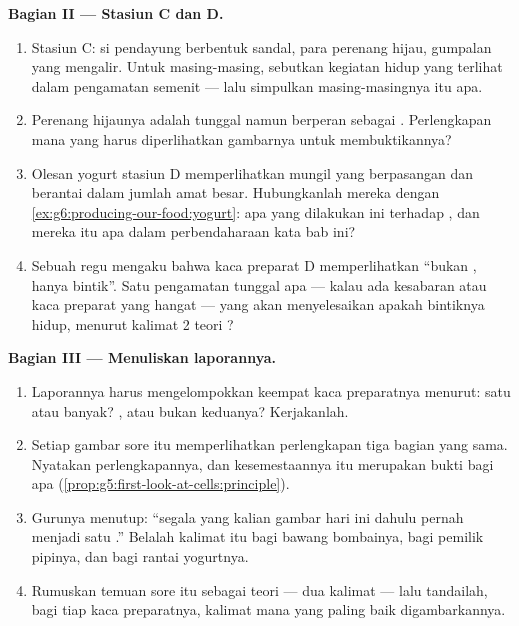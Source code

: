 \begin{problem}
\medskip\noindent\textbf{Bagian II --- Stasiun C dan D.}
\begin{enumerate}[resume]
  \item Stasiun C: si pendayung berbentuk sandal, para perenang hijau,
        gumpalan yang mengalir. Untuk masing-masing, sebutkan kegiatan
        hidup yang terlihat dalam pengamatan semenit --- lalu
        simpulkan masing-masingnya itu apa.
  \item Perenang hijaunya adalah  tunggal namun berperan sebagai
        . Perlengkapan mana yang harus diperlihatkan gambarnya
        untuk membuktikannya?
  \item Olesan yogurt stasiun D memperlihatkan  mungil yang
        berpasangan dan berantai dalam jumlah amat besar. Hubungkanlah
        mereka dengan \cref{ex:g6:producing-our-food:yogurt}: apa yang
        dilakukan  ini terhadap , dan mereka itu apa dalam
        perbendaharaan kata bab ini?
  \item Sebuah regu mengaku bahwa kaca preparat D memperlihatkan
        ``bukan , hanya bintik''. Satu pengamatan tunggal
        apa --- kalau ada kesabaran atau kaca preparat yang hangat ---
        yang akan menyelesaikan apakah bintiknya hidup, menurut
        kalimat 2 teori ?
\end{enumerate}

\medskip\noindent\textbf{Bagian III --- Menuliskan laporannya.}
\begin{enumerate}[resume]
  \item Laporannya harus mengelompokkan keempat kaca preparatnya
        menurut: satu  atau banyak? ,  atau bukan
        keduanya? Kerjakanlah.
  \item Setiap gambar sore itu memperlihatkan perlengkapan tiga bagian
        yang sama. Nyatakan perlengkapannya, dan kesemestaannya itu
        merupakan bukti bagi apa
        (\cref{prop:g5:first-look-at-cells:principle}).
  \item Gurunya menutup: ``segala yang kalian gambar hari ini dahulu
        pernah menjadi satu .'' Belalah kalimat itu bagi bawang
        bombainya, bagi pemilik  pipinya, dan bagi rantai yogurtnya.
  \item Rumuskan temuan sore itu sebagai teori  --- dua kalimat
        --- lalu tandailah, bagi tiap kaca preparatnya, kalimat mana
        yang paling baik digambarkannya.
\end{enumerate}
\end{problem}
